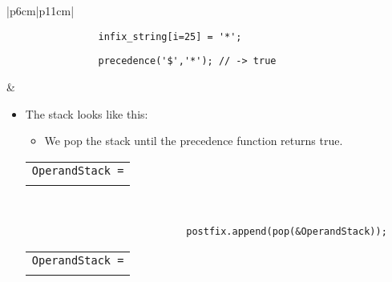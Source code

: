 \begin{center}
\begin{longtable}{ |p{6cm}|p{11cm}| }
        {
            \begin{verbatim}
                infix_string[i=25] = '*';
            \end{verbatim}
        }
        {
            \begin{verbatim}
                precedence('$','*'); // -> true
            \end{verbatim}
        }
        & 
        \begin{itemize}
            \item The stack looks like this: 
                {
                    \begin{center}
                        \begin{itemize}
                            \item We pop the stack until the precedence function returns true. 
                        \end{itemize}
                        \begin{tabular}{ c }
                            \texttt{OperandStack =} \\ \\
                        \end{tabular}
                        \begin{bytefield}{10}
                             \\
                        \end{bytefield}
                        \begin{verbatim}
                            postfix.append(pop(&OperandStack));
                        \end{verbatim}
                        \begin{tabular}{ c }
                            \texttt{OperandStack =} \\ \\
                        \end{tabular}
                        \begin{bytefield}{10}

\end{bytefield}
\end{center}}
\end{itemize}
\end{longtable}
\end{center}
